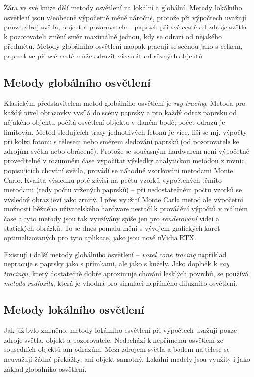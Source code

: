 Žára ve své knize \cite{ZaraJiri2004Mpg} dělí metody osvětlení na lokální a globální. Metody lokálního osvětlení jsou všeobecně výpočetně méně náročné, protože při výpočtech uvažují pouze zdroj světla, objekt a pozorovatele -- paprsek při své cestě od zdroje světla k pozorovateli změní směr maximálně jednou, kdy se odrazí od nějakého předmětu. Metody globálního osvětlení naopak pracují se scénou jako s celkem, paprsek se při své cestě může odrazit vícekrát od různých objektů.

\subsection{Metody globálního osvětlení}
Klasickým představitelem metod globálního osvětlení je \textit{ray tracing}. Metoda pro každý pixel obrazovky vysílá do scény paprsky a pro každý odraz paprsku od nějakého objektu počítá osvětlení objektu v daném bodě; počet odrazů je limitován. Metod sledujících trasy jednotlivých fotonů je více, liší se mj. výpočty při kolizi fotonu s tělesem nebo směrem sledování paprsků (od pozorovatele ke zdrojům světla nebo obráceně). Protože se současným hardwarem není výpočetně proveditelné v rozumném čase vypočítat výsledky analytickou metodou z rovnic popisujících chování světla, provádí se náhodné vzorkování metodami Monte Carlo. Kvalita výsledku poté závisí na počtu vzorků vypočtených těmito metodami (tedy počtu vržených paprsků) -- při nedostatečném počtu vzorků se výsledný obraz jeví jako zrnitý. I přes využití Monte Carlo metod ale výpočetní možnosti běžného uživatelského hardware nestačí k provádění výpočtů v reálném čase a tyto metody jsou tak využívány spíše jen pro \textit{renderování} videí a statických obrázků. To se dnes pomalu mění s vývojem grafických karet optimalizovaných pro tyto aplikace, jako jsou nové nVidia RTX\texttrademark \cite{2018NRTR}.

Existují i další metody globálního osvětlení -- \textit{voxel cone tracing} \cite{CrassinCyril2011IIIU} například nepracuje s paprsky jako s přímkami, ale jako s kužely. Jako doplněk k \textit{ray tracingu}, který dostatečně dobře aproximuje chování lesklých povrchů, se používá \textit{metoda radiozity}, která je vhodná pro simulaci nepřímého difuzního osvětlení.

\subsection{Metody lokálního osvětlení}
Jak již bylo zmíněno, metody lokálního osvětlení při výpočtech uvažují pouze zdroje světla, objekt a pozorovatele. Nedochází k nepřímému osvětlení ze sousedních objektů ani odrazům. Mezi zdrojem světla a bodem na tělese se neuvažují žádné překážky, ani objekt samotný. Lokální modely jsou využity i jako základ globálního osvětlení.

